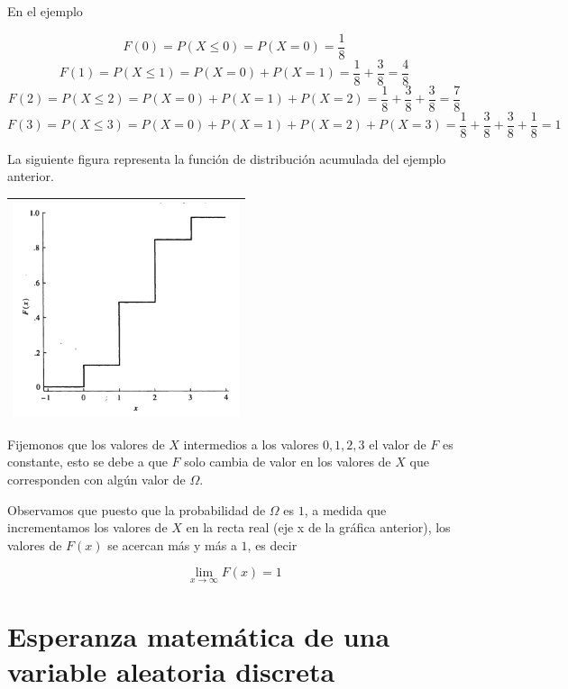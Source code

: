 \documentclass[]{book}
\theoremstyle{plain}
\theoremstyle{definition}
\theoremstyle{definition} %
\begin{document}
En el ejemplo

\[F(0) = P(X\leq 0) = P(X=0) = \frac{1}{8}\]
\[F(1) = P(X\leq 1) = P(X=0) + P(X=1) = \frac{1}{8} + \frac{3}{8}= \frac{4}{8}\]
\[F(2) = P(X\leq 2) = P(X=0) + P(X=1) + P(X=2) = \frac{1}{8} + \frac{3}{8} + \frac{3}{8} = \frac{7}{8}\]
\[F(3) = P(X\leq 3)  = P(X=0) + P(X=1) + P(X=2) + P(X=3)= \frac{1}{8} + \frac{3}{8} + \frac{3}{8} + \frac{1}{8} =1\]

La siguiente figura representa la función de distribución acumulada del
ejemplo anterior.

\begin{longtable}[]{@{}l@{}}
\toprule
\endhead
\includegraphics[width=2.60417in,height=\textheight]{funcion_dist_acumulada.png}\tabularnewline
\bottomrule
\end{longtable}

Fijemonos que los valores de \(X\) intermedios a los valores
\(0, 1, 2, 3\) el valor de \(F\) es constante, esto se debe a que \(F\)
solo cambia de valor en los valores de \(X\) que corresponden con algún
valor de \(\Omega\).

Observamos que puesto que la probabilidad de \(\Omega\) es \(1\), a
medida que incrementamos los valores de \(X\) en la recta real (eje x de
la gráfica anterior), los valores de \(F(x)\) se acercan más y más a
\(1\), es decir

\[\lim_{x\to\infty} F(x) = 1\]


\section{Esperanza matemática de una variable aleatoria
discreta}
\end{document}

